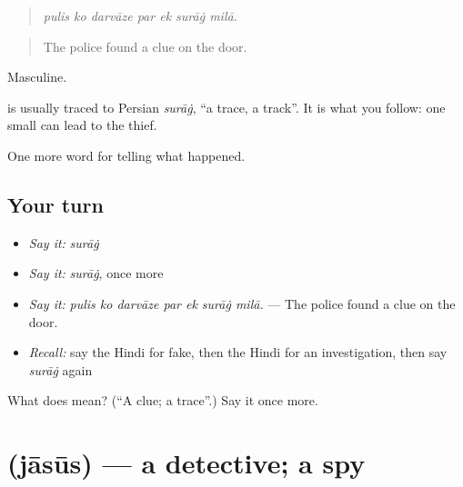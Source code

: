 \begin{quote}
      
\end{quote}

\begin{quote}
\emph{pulis ko darvāze par ek surāġ milā.}
\end{quote}

\begin{quote}
The police found a clue on the door.
\end{quote}

Masculine.

\begin{cousinweb}
is usually traced to Persian \emph{surāġ}, \textquotedblleft{}a trace, a track\textquotedblright{}. It is what you follow: one small \textbf{} can lead to the thief.
\end{cousinweb}

\begin{grammarlens}[title={What you've built}]
One more word for telling what happened.
\end{grammarlens}

\subsection*{Your turn}
\begin{itemize}
\raggedright
  \item \emph{Say it:} \emph{surāġ}
  \item \emph{Say it:} \emph{surāġ}, once more
  \item \emph{Say it:} \emph{pulis ko darvāze par ek surāġ milā.} — The police found a clue on the door.
  \item \emph{Recall:} say the Hindi for fake, then the Hindi for an investigation, then say \emph{surāġ} again
\end{itemize}

\begin{tcolorbox}[breakable,colback=teal!4,colframe=teal!35!black,title={Before you move on}]
What does  mean? (\textquotedblleft{}A clue; a trace\textquotedblright{}.) Say it once more.
\end{tcolorbox}
\section[\texorpdfstring{\hi{जासूस} (jāsūs)}{जासूस (jāsūs)}]{ (jāsūs) — a detective; a spy}


